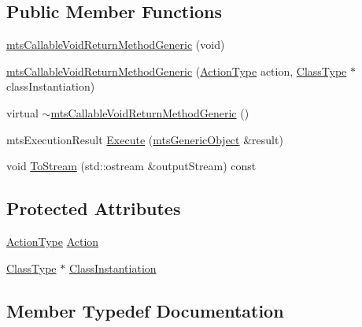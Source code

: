 \subsection*{Public Member Functions}
\begin{DoxyCompactItemize}
\item 
\hyperlink{classmts_callable_void_return_method_generic_a1f1a1a91485ab54baff1e281b4faab27}{mts\+Callable\+Void\+Return\+Method\+Generic} (void)
\item 
\hyperlink{classmts_callable_void_return_method_generic_a3bd1896e16edc15bc0fe7c9a61c7bab6}{mts\+Callable\+Void\+Return\+Method\+Generic} (\hyperlink{classmts_callable_void_return_method_generic_ad94bb941833d1c2d74bb718f3bf81456}{Action\+Type} action, \hyperlink{classmts_callable_void_return_method_generic_ac65a16eb6baf786e6eba07bb920cbf1f}{Class\+Type} $\ast$class\+Instantiation)
\item 
virtual \hyperlink{classmts_callable_void_return_method_generic_ab6e18a6783eb48a89decdfd7356ba62b}{$\sim$mts\+Callable\+Void\+Return\+Method\+Generic} ()
\item 
mts\+Execution\+Result \hyperlink{classmts_callable_void_return_method_generic_a91f3095091379fafba6adea4676d4019}{Execute} (\hyperlink{classmts_generic_object}{mts\+Generic\+Object} \&result)
\item 
void \hyperlink{classmts_callable_void_return_method_generic_aac08fdc349e9cea779f98809fa77ba44}{To\+Stream} (std\+::ostream \&output\+Stream) const 
\end{DoxyCompactItemize}
\subsection*{Protected Attributes}
\begin{DoxyCompactItemize}
\item 
\hyperlink{classmts_callable_void_return_method_generic_ad94bb941833d1c2d74bb718f3bf81456}{Action\+Type} \hyperlink{classmts_callable_void_return_method_generic_a3d55827aaf012a7732d1956ef5ff583e}{Action}
\item 
\hyperlink{classmts_callable_void_return_method_generic_ac65a16eb6baf786e6eba07bb920cbf1f}{Class\+Type} $\ast$ \hyperlink{classmts_callable_void_return_method_generic_a15414bc65b1c9d9b97b8cfcbc7c3b2d8}{Class\+Instantiation}
\end{DoxyCompactItemize}


\subsection{Member Typedef Documentation}
\hypertarget{classmts_callable_void_return_method_generic_ad94bb941833d1c2d74bb718f3bf81456}{}
